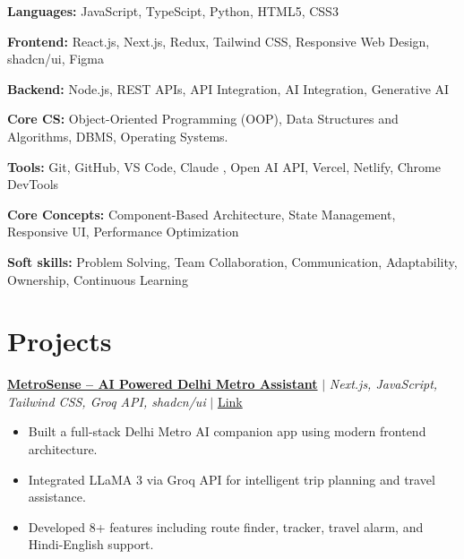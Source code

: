 \documentclass[letterpaper,10pt]{article}
\begin{document}
\begin{itemize}[leftmargin=0.15in]
\small{
\item \textbf{Languages:} JavaScript, TypeScipt, Python, HTML5, CSS3

\item \textbf{Frontend:} React.js, Next.js, Redux, Tailwind CSS, Responsive Web Design, shadcn/ui, Figma

\item \textbf{Backend:} Node.js, REST APIs, API Integration, AI Integration, Generative AI

\item \textbf{Core CS:} Object-Oriented Programming (OOP), Data Structures and Algorithms, DBMS, Operating Systems.

\item \textbf{Tools:} Git, GitHub, VS Code, Claude , Open AI API, Vercel, Netlify, Chrome DevTools

\item \textbf{Core Concepts:} Component-Based Architecture, State Management, Responsive UI, Performance Optimization

\item \textbf{Soft skills:} Problem Solving, Team Collaboration, Communication, Adaptability, Ownership, Continuous Learning
}
\end{itemize}

\vspace{-16pt}


\section{Projects}

\textbf{\href{https://metro-sense.netlify.app/}{MetroSense -- AI Powered Delhi Metro Assistant}}
$|$ \emph{Next.js, JavaScript, Tailwind CSS, Groq API, shadcn/ui}
$|$ \href{https://github.com/vivekbhattacharya01-gif/Metro-sense}{Link}

\begin{itemize}[leftmargin=0.25in]
    \item Built a full-stack Delhi Metro AI companion app using modern frontend architecture.
    \item Integrated LLaMA 3 via Groq API for intelligent trip planning and travel assistance.
    \item Developed 8+ features including route finder, tracker, travel alarm, and Hindi-English support.
\end{itemize}
\end{document}
